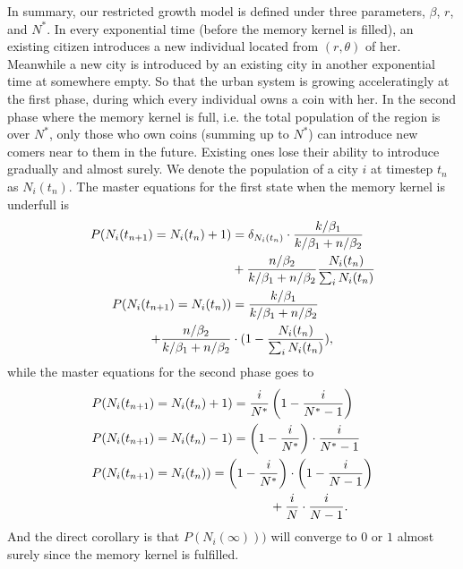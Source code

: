 \documentclass[reprint,unsortedaddress,amsmath,amssymb,floatfix,aps,prl,showkeys]{revtex4-2}
\begin{document}
In summary, our restricted growth model is defined under three parameters, $\beta$, $r$, and $N^*$. In every exponential time (before the memory kernel is filled), an existing citizen introduces a new individual located from $(r,\theta)$ of her. Meanwhile a new city is introduced by an existing city in another exponential time at somewhere empty. So that the urban system is growing acceleratingly at the first phase, during which every individual owns a coin with her. In the second phase where the memory kernel is full, i.e. the total population of the region is over $N^*$, only those who own coins (summing up to $N^*$) can introduce new comers near to them in the future. Existing ones lose their ability to introduce gradually and almost surely. We denote the population of a city $i$ at timestep $t_n$ as $N_i(t_n)$. The master equations for the first state when the memory kernel is underfull is 
\begin{align}
    P(N_i(t_{n+1}) = N_i(t_{n})+1) &= \delta_{N_i(t_n)}\cdot\frac{k/\beta_1}{k/\beta_1 + n/\beta_2}\notag \\ &+ \frac{n/\beta_2}{k/\beta_1 + n/\beta_2}\frac{N_i(t_{n})}{\sum_i N_i(t_{n})} \notag \\
    P(N_i(t_{n+1}) = N_i(t_{n})) &= \frac{k/\beta_1}{k/\beta_1 + n/\beta_2}\notag \\ + \frac{n/\beta_2}{k/\beta_1 + n/\beta_2}&\cdot (1-\frac{N_i(t_{n})}{\sum_i N_i(t_{n})}),
\end{align}
while the master equations for the second phase goes to\begin{align}
    &P(N_i(t_{n+1}) = N_i(t_{n})+1)=\frac{i}{N^*}\left(1-\frac{i}{N^*-1}\right)\notag\\
    & P(N_i(t_{n+1}) = N_i(t_{n})-1)=\left(1-\frac{i}{N^*}\right) \cdot \frac{i}{N^*-1}\notag\\
    & P(N_i(t_{n+1}) = N_i(t_{n}))=\left(1-\frac{i}{N^*}\right) \cdot\left(1-\frac{i}{N-1}\right) \notag\\ &\hspace{5cm}+ \frac{i}{N}\cdot\frac{i}{N-1}.
\end{align}
And the direct corollary is that $P(N_i(\infty)))$ will converge to $0$ or $1$ almost surely since the memory kernel is fulfilled. 

\end{document}

